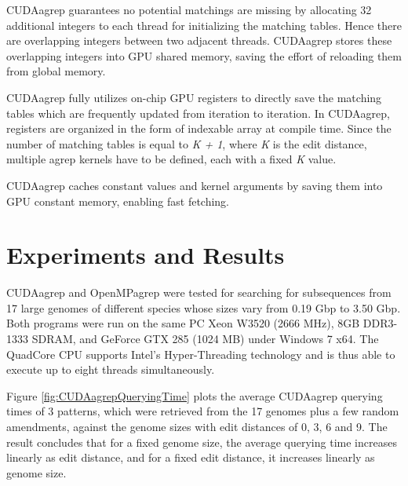 CUDAagrep guarantees no potential matchings are missing by allocating 32 additional integers to each thread for initializing the matching tables. Hence there are overlapping integers between two adjacent threads. CUDAagrep stores these overlapping integers into GPU shared memory, saving the effort of reloading them from global memory.

CUDAagrep fully utilizes on-chip GPU registers to directly save the matching tables which are frequently updated from iteration to iteration. In CUDAagrep, registers are organized in the form of indexable array at compile time. Since the number of matching tables is equal to \textit{K + 1}, where \textit{K} is the edit distance, multiple agrep kernels have to be defined, each with a fixed \textit{K} value.

CUDAagrep caches constant values and kernel arguments by saving them into GPU constant memory, enabling fast fetching.

\section{Experiments and Results}

CUDAagrep and OpenMPagrep were tested for searching for subsequences from 17 large genomes of different species whose sizes vary from 0.19 Gbp to 3.50 Gbp. Both programs were run on the same PC Xeon W3520 (2666 MHz), 8GB DDR3-1333 SDRAM, and GeForce GTX 285 (1024 MB) under Windows 7 x64. The QuadCore CPU supports Intel's Hyper-Threading technology and is thus able to execute up to eight threads simultaneously.

Figure \ref{fig:CUDAagrepQueryingTime} plots the average CUDAagrep querying times of 3 patterns, which were retrieved from the 17 genomes plus a few random amendments, against the genome sizes with edit distances of 0, 3, 6 and 9. The result concludes that for a fixed genome size, the average querying time increases linearly as edit distance, and for a fixed edit distance, it increases linearly as genome size.

